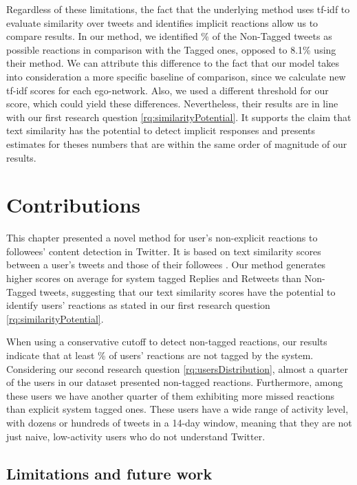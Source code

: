 Regardless of these limitations, the fact that the underlying method uses tf-idf to evaluate similarity over tweets and identifies implicit reactions allow us to compare results. In our method, we identified \highNonTaggedTweetCountPct{}\% of the Non-Tagged tweets as possible reactions in comparison with the Tagged ones, opposed to 8.1\% using their method. We can attribute this difference to the fact that our model takes into consideration a more specific baseline of comparison, since we calculate new tf-idf scores for each ego-network. Also, we used a different threshold for our score, which could yield these differences. Nevertheless, their results are in line with our first research question \ref{rq:similarityPotential}. It supports the claim that text similarity has the potential to detect implicit responses and presents estimates for theses numbers that are within the same order of magnitude of our results.


\section{Contributions}

This chapter presented a novel method for user's non-explicit reactions to followees' content detection in Twitter. It is based on text similarity scores between a user's tweets and those of their followees \cite{Barbosa}.  Our method generates higher scores on average for system tagged Replies and Retweets than Non-Tagged tweets, suggesting that our text similarity scores have the potential to identify users' reactions as stated in our first research question \ref{rq:similarityPotential}.  

When using a conservative cutoff to detect non-tagged reactions, our results indicate that at least \highNonTaggedTweetCountPct{}\% of users' reactions are not tagged by the system.  Considering our second research question \ref{rq:usersDistribution}, almost a quarter of the users in our dataset presented non-tagged reactions. Furthermore, among these users we have another quarter of them exhibiting more missed reactions than explicit system tagged ones. These users have a wide range of activity level, with dozens or hundreds of tweets in a 14-day window, meaning that they are not just naive, low-activity users who do not understand Twitter.

\subsection{Limitations and future work}

